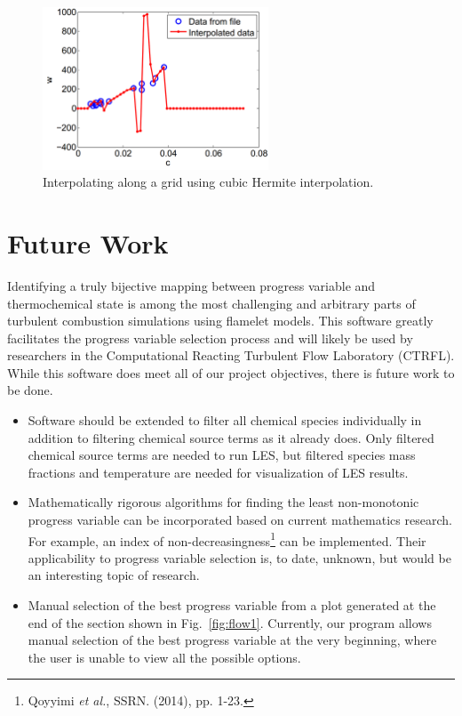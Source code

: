 \documentclass[11pt]{article}
\begin{document}
\begin{figure} [h]
\centering
\includegraphics[width=0.6\textwidth]{interpolator}
\caption{\label{fig:interpolator} Interpolating along a grid using
  cubic Hermite interpolation.}
\end{figure}

\section{Future Work}
Identifying a truly bijective mapping between progress variable and
thermochemical state is among the most challenging and arbitrary parts
of turbulent combustion simulations using flamelet models. This
software greatly facilitates the progress variable selection process
and will likely be used by researchers in the Computational Reacting
Turbulent Flow Laboratory (CTRFL). While this software does meet all
of our project objectives, there is future work to be done.

\begin{itemize}
\item Software should be extended to filter all chemical species
  individually in addition to filtering chemical source terms as it
  already does. Only filtered chemical source terms are needed to run
  LES, but filtered species mass fractions and temperature are needed
  for visualization of LES results.
\item Mathematically rigorous algorithms for finding the least
  non-monotonic progress variable can be incorporated based on current
  mathematics research. For example, an index of
  non-decreasingness\footnote{Qoyyimi \textit{et al.}, SSRN. (2014),
    pp. 1-23.} can be implemented. Their applicability to progress
  variable selection is, to date, unknown, but would be an interesting
  topic of research.
\item Manual selection of the best progress variable from a plot
  generated at the end of the section shown in
  Fig.~\ref{fig:flow1}. Currently, our program allows manual selection
  of the best progress variable at the very beginning, where the user
  is unable to view all the possible options.
\end{itemize}
\end{document}
